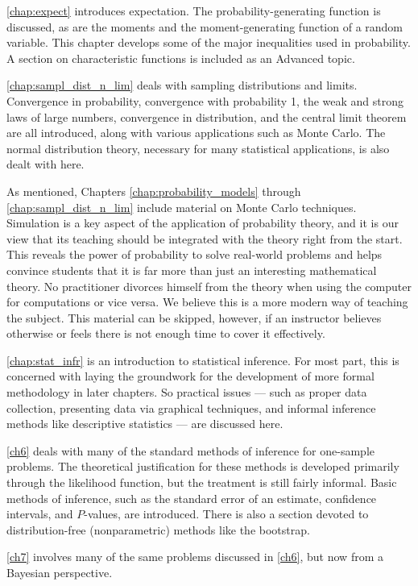 \autoref{chap:expect} introduces expectation. The probability-generating function is discussed, as are the moments and the moment-generating function of a random variable. This chapter develops some of the major inequalities used in probability. A section on characteristic functions is included as an Advanced topic.

\autoref{chap:sampl_dist_n_lim} deals with sampling distributions and limits. Convergence in probability, convergence with probability 1, the weak and strong laws of large numbers, convergence in distribution, and the central limit theorem are all introduced, along with various applications such as Monte Carlo. The normal distribution theory, necessary  for  many statistical applications, is also dealt with here.

As mentioned, Chapters \ref{chap:probability_models} through \ref{chap:sampl_dist_n_lim} include material on Monte Carlo techniques. Simulation is a key aspect of the application of probability theory, and it is our view that its teaching should be integrated with the theory right from the start. This reveals the power of probability to solve real-world problems and helps convince students that it is far more than just an interesting mathematical theory. No practitioner divorces himself from the theory when using the computer for computations or vice versa. We believe this is a more modern way of teaching the subject. This material can be skipped, however, if an instructor believes otherwise or feels there is not enough time to cover it effectively.

\autoref{chap:stat_infr} is an introduction to statistical inference. For most part, this is concerned with laying the groundwork for the development of more formal methodology in later chapters. So practical issues --- such as proper data collection, presenting data via graphical techniques, and informal inference methods like descriptive statistics --- are discussed here.

\autoref{ch6} deals with many of the standard methods of inference for one-sample problems. The theoretical justification for these methods is developed primarily through the likelihood function, but the treatment is still fairly informal. Basic methods of inference, such as the standard error of an estimate, confidence intervals, and $P$-values, are introduced. There is also a section devoted to distribution-free (nonparametric) methods like the bootstrap.

\autoref{ch7} involves many of the same problems discussed in \autoref{ch6}, but now from a Bayesian perspective.